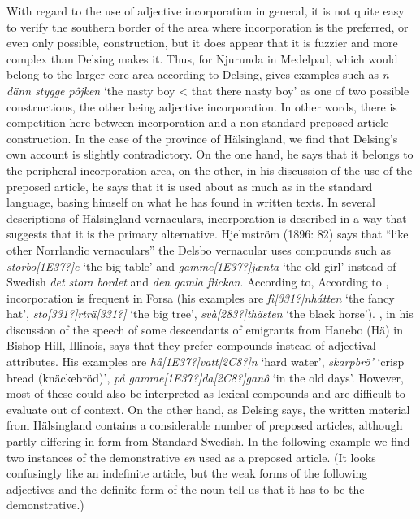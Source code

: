\begin{styleBodyTextFirst}
With regard to the use of adjective incorporation in general, it is not quite easy to verify the southern border of the area where incorporation is the preferred, or even only possible, construction, but it does appear that it is fuzzier and more complex than Delsing makes it. Thus, for Njurunda in Medelpad, which would belong to the larger core area according to Delsing, \citet[59]{Stenbom1916} gives examples such as \textit{n dänn stygge pôjken} ‘the nasty boy {\textless} that there nasty boy’ as one of two possible constructions, the other being adjective incorporation. In other words, there is competition here between incorporation and a non-standard preposed article construction. In the case of the province of Hälsingland, we find that Delsing’s own account is slightly contradictory. On the one hand, he says that it belongs to the peripheral incorporation area, on the other, in his discussion of the use of the preposed article, he says that it is used about as much as in the standard language, basing himself on what he has found in written texts. In several descriptions of Hälsingland vernaculars, incorporation is described in a way that suggests that it is the primary alternative. Hjelmström (1896: 82) says that “like other Norrlandic vernaculars” the Delsbo vernacular uses compounds such as \textit{storbo[1E37?]e} ‘the big table’ and \textit{gamme}\textit{[1E37?]}\textit{jænta} ‘the old girl’ instead of Swedish \textit{det stora bordet} and \textit{den gamla flickan}. According to, According to \citet[31]{Franck1995}, incorporation is frequent in Forsa (his examples are \textit{fì[331?]nhátten }‘the fancy hat’, \textit{sto[331?]rträ[331?] }‘the big tree’, \textit{svà[283?]thästen} ‘the black horse’). \citet[62]{Hedblom1978}, in his discussion of the speech of some descendants of emigrants from Hanebo (Hä) in Bishop Hill, Illinois, says that they prefer compounds instead of adjectival attributes. His examples are \textit{hå{\textasciigrave}[1E37?]vatt[2C8?]n} ‘hard water’, \textit{skar{\textasciigrave}pbrö’} ‘crisp bread (knäckebröd)’, \textit{på gamme[1E37?]da[2C8?]ganô} ‘in the old days’. However, most of these could also be interpreted as lexical compounds and are difficult to evaluate out of context. On the other hand, as Delsing says, the written material from Hälsingland contains a considerable number of preposed articles, although partly differing in form from Standard Swedish. In the following example we find two instances of the demonstrative \textit{en} used as a preposed article. (It looks confusingly like an indefinite article, but the weak forms of the following adjectives and the definite form of the noun tell us that it has to be the demonstrative.) 

\end{styleBodyTextFirst}

